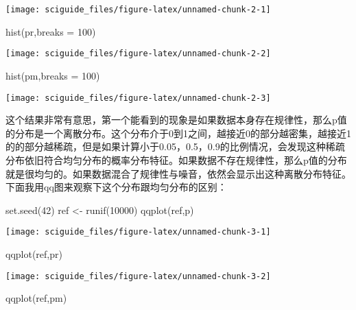 \documentclass[]{tufte-book}
\newenvironment{Shaded}{}{}
\newcommand{\AttributeTok}[1]{\textcolor[rgb]{0.49,0.56,0.16}{#1}}
\newcommand{\DecValTok}[1]{\textcolor[rgb]{0.25,0.63,0.44}{#1}}
\newcommand{\FunctionTok}[1]{\textcolor[rgb]{0.02,0.16,0.49}{#1}}
\newcommand{\NormalTok}[1]{#1}
\newcommand{\OtherTok}[1]{\textcolor[rgb]{0.00,0.44,0.13}{#1}}
\begin{document}
\texttt{[image: sciguide\_files/figure-latex/unnamed-chunk-2-1]}

\begin{Shaded}
\begin{Highlighting}[]
\FunctionTok{hist}\NormalTok{(pr,}\AttributeTok{breaks =} \DecValTok{100}\NormalTok{)}
\end{Highlighting}
\end{Shaded}

\texttt{[image: sciguide\_files/figure-latex/unnamed-chunk-2-2]}

\begin{Shaded}
\begin{Highlighting}[]
\FunctionTok{hist}\NormalTok{(pm,}\AttributeTok{breaks =} \DecValTok{100}\NormalTok{)}
\end{Highlighting}
\end{Shaded}

\texttt{[image: sciguide\_files/figure-latex/unnamed-chunk-2-3]}

这个结果非常有意思，第一个能看到的现象是如果数据本身存在规律性，那么p值的分布是一个离散分布。这个分布介于0到1之间，越接近0的部分越密集，越接近1的的部分越稀疏，但是如果计算小于0.05，0.5，0.9的比例情况，会发现这种稀疏分布依旧符合均匀分布的概率分布特征。如果数据不存在规律性，那么p值的分布就是很均匀的。如果数据混合了规律性与噪音，依然会显示出这种离散分布特征。下面我用qq图来观察下这个分布跟均匀分布的区别：

\begin{Shaded}
\begin{Highlighting}[]
\FunctionTok{set.seed}\NormalTok{(}\DecValTok{42}\NormalTok{)}
\NormalTok{ref }\OtherTok{\textless{}{-}} \FunctionTok{runif}\NormalTok{(}\DecValTok{10000}\NormalTok{)}
\FunctionTok{qqplot}\NormalTok{(ref,p)}
\end{Highlighting}
\end{Shaded}

\texttt{[image: sciguide\_files/figure-latex/unnamed-chunk-3-1]}

\begin{Shaded}
\begin{Highlighting}[]
\FunctionTok{qqplot}\NormalTok{(ref,pr)}
\end{Highlighting}
\end{Shaded}

\texttt{[image: sciguide\_files/figure-latex/unnamed-chunk-3-2]}

\begin{Shaded}
\begin{Highlighting}[]
\FunctionTok{qqplot}\NormalTok{(ref,pm)}
\end{Highlighting}
\end{Shaded}
\end{document}
